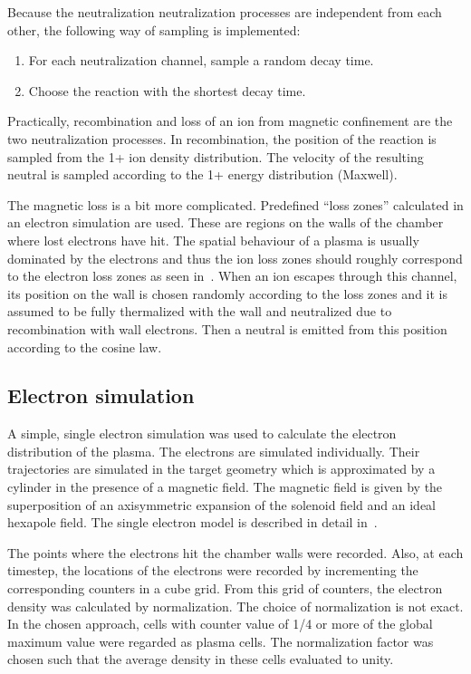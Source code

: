 \documentclass[a4paper,twoside,12pt]{article}
\begin{document}
Because the neutralization neutralization processes are independent from each other, the following way of sampling is implemented:
\begin{enumerate}
    \item For each neutralization channel, sample a random decay time.
    \item Choose the reaction with the shortest decay time.
\end{enumerate}

Practically, recombination and loss of an ion from magnetic confinement are the two neutralization processes. In recombination, the position of the reaction is sampled from the 1+ ion density distribution. The velocity of the resulting neutral is sampled according to the 1+ energy distribution (Maxwell).

The magnetic loss is a bit more complicated. Predefined ``loss zones''
calculated in an electron simulation are used. These are regions on the walls
of the chamber where lost electrons have hit. The spatial behaviour of a plasma
is usually dominated by the electrons and thus the ion loss zones should
roughly correspond to the electron loss zones as seen in~\cite{kalvas:hiisi}. When an ion escapes through this channel, its position on the wall is chosen randomly according to the loss zones and it is assumed to be fully thermalized with the wall and neutralized due to recombination with wall electrons. Then a neutral is emitted from this position according to the cosine law.

\subsection{Electron simulation}
A simple, single electron simulation was used to calculate the electron distribution of the plasma. The electrons are simulated individually. Their trajectories are simulated in the target geometry which is approximated by a cylinder in the presence of a magnetic field. The magnetic field is given by the superposition of an axisymmetric expansion of the solenoid field and an ideal hexapole field. The single electron model is described in detail in~\cite{kalvas:hiisi}.

The points where the electrons hit the chamber walls were recorded. Also, at each timestep, the locations of the electrons were recorded by incrementing the corresponding counters in a cube grid. From this grid of counters, the electron density was calculated by normalization. The choice of normalization is not exact. In the chosen approach, cells with counter value of 1/4 or more of the global maximum value were regarded as plasma cells. The normalization factor was chosen such that the average density in these cells evaluated to unity.
\end{document}
